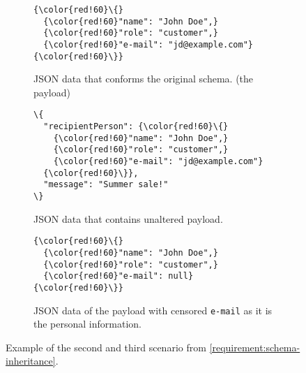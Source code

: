 \begin{figure}[h!]\centering
  \begin{subfigure}{\textwidth}
  \begin{Verbatim}[commandchars=\\\{\}]
{\color{red!60}\{}
  {\color{red!60}"name": "John Doe",}
  {\color{red!60}"role": "customer",}
  {\color{red!60}"e-mail": "jd@example.com"}
{\color{red!60}\}}
    \end{Verbatim}
    \caption{JSON data that conforms the original schema. (the payload)}
  \end{subfigure}


  \begin{subfigure}[b]{.45\textwidth}

    \begin{Verbatim}[commandchars=\\\{\}]
\{
  "recipientPerson": {\color{red!60}\{}
    {\color{red!60}"name": "John Doe",}
    {\color{red!60}"role": "customer",}
    {\color{red!60}"e-mail": "jd@example.com"}
  {\color{red!60}\}},
  "message": "Summer sale!"
\}
    \end{Verbatim}
    \caption{JSON data that contains unaltered payload.}
    \label{fig:schema-inheritance:json-data-unaltered}
  \end{subfigure}\hfill%
  \begin{subfigure}[b]{.45\textwidth}
    \begin{Verbatim}[commandchars=\\\{\}]
{\color{red!60}\{}
  {\color{red!60}"name": "John Doe",}
  {\color{red!60}"role": "customer",}
  {\color{red!60}"e-mail": null}
{\color{red!60}\}}
    \end{Verbatim}
    \caption{JSON data of the payload with censored {\tt e-mail} as it is the personal information.}
    \label{fig:schema-inheritance:json-data-censored}
    \end{subfigure}%
  \caption{Example of the second and third scenario from \autoref{requirement:schema-inheritance}.}
\end{figure}


